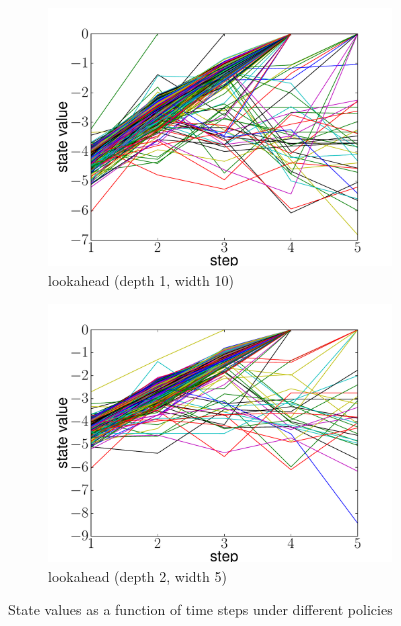 \begin{figure}
\begin{subfigure}[b]{0.48\linewidth}
    \includegraphics[width=\textwidth]{figures/state_value_lookahead1-10.pdf}
    \caption{lookahead (depth 1, width 10)}
    \label{fig:value_lookahead_1}
  \end{subfigure}
  \begin{subfigure}[b]{0.48\linewidth}
    \includegraphics[width=\textwidth]{figures/state_value_lookahead2-5.pdf}
    \caption{lookahead (depth 2, width 5)}
    \label{fig:value_lookahead_2}
  \end{subfigure}
  \caption{State values as a function of time steps under different policies}\label{fig:values}
\end{figure}

